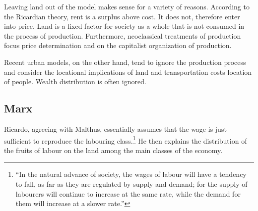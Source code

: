 Leaving land out of the model makes sense for a variety of reasons. According to the Ricardian theory, rent is a surplus above cost. It does not, therefore enter into price. Land is a fixed factor for society as a whole that is not consumed in  the process of production.  Furthermore, neoclassical treatments of production  focus price determination and on the capitalist organization of production. 






Recent urban models, on the other hand, tend to ignore the production process and consider the locational implications of land and transportation costs location of people. Wealth distribution is often ignored. 

\subsection{Marx}

Ricardo, agreeing with Malthus, essentially assumes that the wage is  just sufficient to reproduce the labouring class.\footnote{``In the natural advance of society, the wages of labour will have a tendency to fall, as far as they are regulated by supply and demand; for the supply of labourers will continue to increase at the same rate, while the demand for them will increase at a slower rate.''} He then explains the distribution of the fruits of labour on the land among the main classes of the economy.

